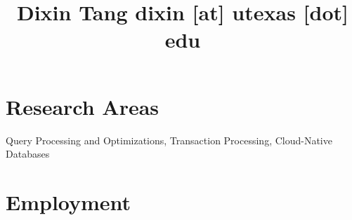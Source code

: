 \documentclass[10pt]{article} %
\begin{document}

\title{Dixin Tang {\small dixin [at] utexas [dot] edu}} %
\vspace{-5mm}

\begin{comment}
\parbox{0.5\textwidth}{ %
\begin{tabbing} %
\hspace{2.5cm} \= \hspace{4cm} \= \kill %
Postdoctoral Scholar \\
University of California, Berkeley \\
387 Soda Hall, Berkeley, CA 94720
\end{tabbing}}
\hfill %
\parbox{0.5\textwidth}{ %
\begin{tabbing} %
\hspace{2.5cm} \= \hspace{4cm} \= \kill %
(+1) 510-365-9300 \\
totemtang@berkeley.edu \\
\url{https://people.eecs.berkeley.edu/~totemtang/}
\end{tabbing}}
\vspace{-5mm}
\end{comment}


\section{Research Areas}

Query Processing and Optimizations, Transaction Processing, Cloud-Native Databases 

\vspace{-5mm}

\section{Employment}
\end{document}
